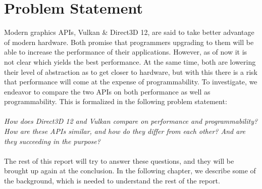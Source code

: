 \section{Problem Statement}\label{sec:problem_statement}
Modern graphics \glspl{API}, Vulkan \& Direct3D 12, are said to take better advantage of modern hardware.
Both promise that programmers upgrading to them will be able to increase the performance of their applications. 
However, as of now it is not clear which yields the best performance.
At the same time, both are lowering their level of abstraction as to get closer to hardware, but with this there is a risk that performance will come at the expense of programmability. 
To investigate, we endeavor to compare the two \glspl{API} on both performance as well as programmability. 
This is formalized in the following problem statement:
\\  \\
\textit{How does Direct3D 12 and Vulkan compare on performance and programmability? How are these \glspl{API} similar, and how do they differ from each other?  And are they succeeding in the purpose?}
\\  \\
The rest of this report will try to answer these questions, and they will be brought up again at the conclusion. 
In the following chapter, we describe some of the background, which is needed to understand the rest of the report.


